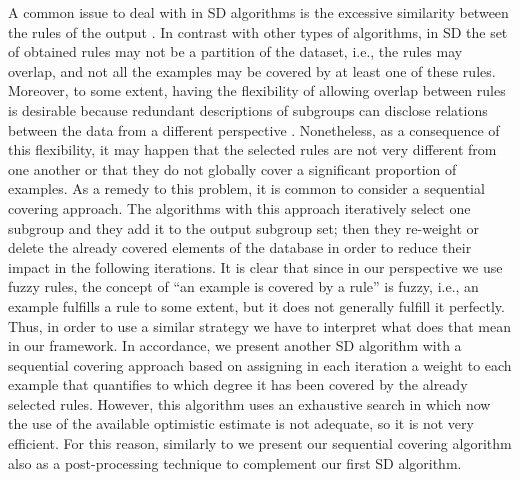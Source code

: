 A common issue to deal with in SD algorithms is the excessive similarity between the rules of the output \cite{Gamberger2002,Atzmueller2015}. In contrast with other types of algorithms, in SD the set of obtained rules may not be a partition of the dataset, i.e., the rules may overlap, and not all the examples may be covered by at least one of these rules. Moreover, to some extent, having the flexibility of allowing overlap between rules is desirable because redundant descriptions of subgroups can disclose relations between the data from a different perspective \cite{delJesus2007}. Nonetheless, as a consequence of this flexibility, it may happen that the selected rules are not very different from one another or that they do not globally cover a significant proportion of examples. As a remedy to this problem, it is common to consider a sequential covering approach. The algorithms with this approach iteratively select one subgroup and they add it to the output subgroup set; then they re-weight or delete the already covered elements of the database in order to reduce their impact in the following iterations. It is clear that since in our perspective we use fuzzy rules, the concept of ``an example is covered by a rule'' is fuzzy, i.e., an example fulfills a rule to some extent, but it does not generally fulfill it perfectly. Thus, in order to use a similar strategy we have to interpret what does that mean in our framework. In accordance, we present another SD algorithm with a sequential covering approach based on assigning in each iteration a weight to each example that quantifies to which degree it has been covered by the already selected rules. However, this algorithm uses an exhaustive search in which now the use of the available optimistic estimate is not adequate, so it is not very efficient. For this reason, similarly to \cite{Jovanoski2001} we present our sequential covering algorithm also as a post-processing technique to complement our first SD algorithm.


